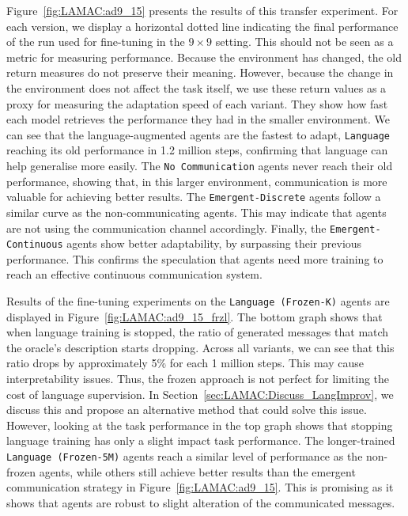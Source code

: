 Figure~\ref{fig:LAMAC:ad9_15} presents the results of this transfer experiment. For each version, we display a horizontal dotted line indicating the final performance of the run used for fine-tuning in the $9\times 9$ setting. This should not be seen as a metric for measuring performance. Because the environment has changed, the old return measures do not preserve their meaning. However, because the change in the environment does not affect the task itself, we use these return values as a proxy for measuring the adaptation speed of each variant. They show how fast each model retrieves the performance they had in the smaller environment. We can see that the language-augmented agents are the fastest to adapt, \texttt{Language} reaching its old performance in 1.2 million steps, confirming that language can help generalise more easily. The \texttt{No Communication} agents never reach their old performance, showing that, in this larger environment, communication is more valuable for achieving better results. The \texttt{Emergent-Discrete} agents follow a similar curve as the non-communicating agents. This may indicate that agents are not using the communication channel accordingly. 
Finally, the \texttt{Emergent-Continuous} agents show better adaptability, by surpassing their previous performance. This confirms the speculation that agents need more training to reach an effective continuous communication system. 

Results of the fine-tuning experiments on the \texttt{Language (Frozen-K)} agents are displayed in Figure~\ref{fig:LAMAC:ad9_15_frzl}. The bottom graph shows that when language training is stopped, the ratio of generated messages that match the oracle's description starts dropping. Across all variants, we can see that this ratio drops by approximately 5\% for each 1 million steps. This may cause interpretability issues. Thus, the frozen approach is not perfect for limiting the cost of language supervision. In Section~\ref{sec:LAMAC:Discuss_LangImprov}, we discuss this and propose an alternative method that could solve this issue. However, looking at the task performance in the top graph shows that stopping language training has only a slight impact task performance. The longer-trained \texttt{Language (Frozen-5M)} agents reach a similar level of performance as the non-frozen agents, while others still achieve better results than the emergent communication strategy in Figure~\ref{fig:LAMAC:ad9_15}. This is promising as it shows that agents are robust to slight alteration of the communicated messages. 

